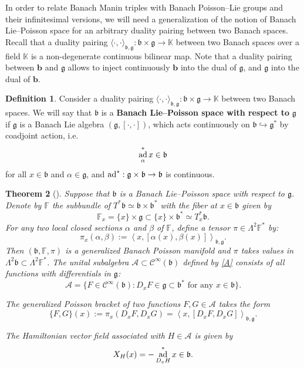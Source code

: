 \documentclass[a4paper,12pt,reqno]{amsart}%
\newtheorem{theorem}{Theorem}
\theoremstyle{definition}
\newtheorem{definition}[theorem]{Definition}
\theoremstyle{remark}
\numberwithin{theorem}{section}
\numberwithin{equation}{section}
\newcommand{\1}{{\bf 1}}
\DeclareMathOperator{\ad}{\textnormal{ad}}
\newcommand{\Cp}{\mathscr{C}}
\newcommand{\g}{{\mathfrak g}}
\newcommand{\bg}{{\mathfrak b}}
\newcommand\K{{\mathbb{K}}}
\renewcommand\b{{\mathbf{b}}}
\begin{document}
In order to relate Banach Manin triples with Banach Poisson--Lie groups and their infinitesimal versions, we will need a generalization of the notion of Banach Lie--Poisson space for an arbitrary duality pairing between two Banach spaces. Recall that a duality pairing $\langle\cdot, \cdot\rangle_{\mathfrak{b}, \mathfrak{g}}:\mathfrak{b}\times\mathfrak{g}\rightarrow\mathbb{K}$ between two Banach spaces over a field $\K$  is a non-degenerate continuous bilinear map. Note that a duality pairing between $\b$ and $\g$ allows to inject continuously $\b$ into the dual of $\g$, and $\g$ into the dual of $\b$.
\begin{definition}\label{def:Banach_Lie_poisson_general}
Consider a duality pairing $\langle\cdot, \cdot\rangle_{\bg, \g}:\bg\times\g\rightarrow\mathbb{K}$ between two Banach spaces.
We will say that $\bg$ is a \textbf{Banach Lie--Poisson space with respect to} $\g$ if $\g$ is a Banach Lie algebra $(\g, [\cdot,\cdot])$, which acts continuously on $\bg\hookrightarrow \g^*$ by coadjoint action, i.e.
\[
\ad^*_\alpha x \in\bg
\]
for all $x \in \bg$ and $\alpha\in\g$, and $\ad^*:\g\times\bg\rightarrow \bg$ is continuous.
\end{definition}

\begin{theorem}[{\cite[Theorem~3.14]{tumpach-bruhat}}]\label{4.2}
Suppose that $\bg$ is a Banach Lie--Poisson space with respect to $\g$. Denote by $\mathbb{F}$ the subbundle of $T^*\bg\simeq \bg\times\bg^*$ with the fiber at $x\in\bg$ given by
\[
\mathbb{F}_x = \{x\}\times\g\subset \{x\}\times\bg^*\simeq T_x^*\bg.
\] 
For any two local closed sections $\alpha$ and $\beta$ of $\mathbb{F}$, define a tensor $\pi\in\Lambda^2\mathbb{F}^*$ by:
\[
\pi_x(\alpha, \beta) := \left\langle x, [\alpha(x), \beta(x)]\right\rangle_{\bg,\g}.
\]
Then $(\bg, \mathbb{F}, \pi)$ is a generalized Banach Poisson manifold and $\pi$ takes values in $\Lambda^2\bg\subset\Lambda^2\mathbb{F}^*$. The unital subalgebra $\mathcal{A}\subset\Cp^{\infty}(\bg)$ defined by \eqref{A} consists of all functions with differentials in $\g$:
\begin{equation}\label{Ag}
 \mathcal{A} =\{ F \in \Cp^\infty(\bg): D_xF \in \g\subset \bg^* \textrm{ for any }x\in\bg\}.
\end{equation}

The generalized Poisson bracket of two functions $F, G\in\mathcal{A}$ takes the form
\begin{equation}\label{pipoisson-blp}
\{F, G\}(x) := \pi_x(D_xF, D_xG) = \left\langle x, [D_xF, D_xG]\right\rangle_{\bg, \g}.
\end{equation}

The Hamiltonian vector field  associated with $H\in \mathcal{A}$ is given by
\[
X_H(x) = -\ad^*_{D_xH}x \in\bg.
\]
\end{theorem}
\end{document}
